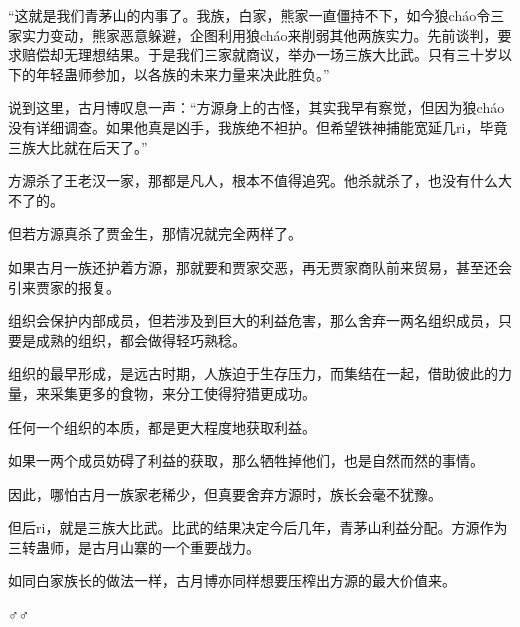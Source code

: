 \begin{this_body}
“这就是我们青茅山的内事了。我族，白家，熊家一直僵持不下，如今狼cháo令三家实力变动，熊家恶意躲避，企图利用狼cháo来削弱其他两族实力。先前谈判，要求赔偿却无理想结果。于是我们三家就商议，举办一场三族大比武。只有三十岁以下的年轻蛊师参加，以各族的未来力量来决此胜负。”

说到这里，古月博叹息一声：“方源身上的古怪，其实我早有察觉，但因为狼cháo没有详细调查。如果他真是凶手，我族绝不袒护。但希望铁神捕能宽延几ri，毕竟三族大比就在后天了。”

方源杀了王老汉一家，那都是凡人，根本不值得追究。他杀就杀了，也没有什么大不了的。

但若方源真杀了贾金生，那情况就完全两样了。

如果古月一族还护着方源，那就要和贾家交恶，再无贾家商队前来贸易，甚至还会引来贾家的报复。

组织会保护内部成员，但若涉及到巨大的利益危害，那么舍弃一两名组织成员，只要是成熟的组织，都会做得轻巧熟稔。

组织的最早形成，是远古时期，人族迫于生存压力，而集结在一起，借助彼此的力量，来采集更多的食物，来分工使得狩猎更成功。

任何一个组织的本质，都是更大程度地获取利益。

如果一两个成员妨碍了利益的获取，那么牺牲掉他们，也是自然而然的事情。

因此，哪怕古月一族家老稀少，但真要舍弃方源时，族长会毫不犹豫。

但后ri，就是三族大比武。比武的结果决定今后几年，青茅山利益分配。方源作为三转蛊师，是古月山寨的一个重要战力。

如同白家族长的做法一样，古月博亦同样想要压榨出方源的最大价值来。

♂♂

\end{this_body}

